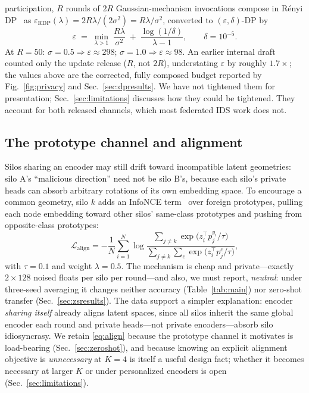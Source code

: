 \documentclass[journal]{IEEEtran}
\newcommand{\eps}{\varepsilon}
\begin{document}
participation, $R$ rounds of $2R$ Gaussian-mechanism invocations
compose in R\'enyi DP~\cite{renyidp} as $\eps_{\mathrm{RDP}}(\lambda) =
2R\lambda / (2\sigma^{2}) = R\lambda/\sigma^{2}$, converted to
$(\eps, \delta)$-DP by
\begin{equation}
\eps \;=\; \min_{\lambda > 1}\;
\frac{R\lambda}{\sigma^{2}} \;+\;
\frac{\log(1/\delta)}{\lambda - 1},
\qquad \delta = 10^{-5}.
\label{eq:rdp}
\end{equation}
At $R{=}50$: $\sigma{=}0.5 \Rightarrow \eps{\approx}298$;
$\sigma{=}1.0 \Rightarrow \eps{\approx}98$. An earlier internal draft
counted only the update release ($R$, not $2R$), understating $\eps$ by
roughly $1.7\times$; the values above are the corrected, fully
composed budget reported by Fig.~\ref{fig:privacy} and
Sec.~\ref{sec:dpresults}. We have not tightened them for presentation;
Sec.~\ref{sec:limitations} discusses how they could be tightened. They
account for both released channels, which most federated IDS work does
not.

\subsection{The prototype channel and alignment}
\label{sec:align}
Silos sharing an encoder may still drift toward incompatible latent
geometries: silo A's ``malicious direction'' need not be silo B's,
because each silo's private heads can absorb arbitrary rotations of
its own embedding space. To encourage a common geometry, silo $k$ adds
an InfoNCE term~\cite{infonce} over foreign prototypes, pulling each
node embedding toward other silos' same-class prototypes and pushing
from opposite-class prototypes:
\begin{equation}
\mathcal{L}_{\mathrm{align}} = -\frac{1}{N}\sum_{i=1}^{N}
\log \frac{\sum_{j \ne k}\exp\!\big(z_i^{\top} p_j^{y_i}/\tau\big)}
{\sum_{j \ne k}\sum_{c}\exp\!\big(z_i^{\top} p_j^{c}/\tau\big)},
\label{eq:align}
\end{equation}
with $\tau{=}0.1$ and weight $\lambda{=}0.5$. The mechanism is cheap
and private---exactly $2 \times 128$ noised floats per silo per
round---and also, we must report, \emph{neutral}: under three-seed
averaging it changes neither accuracy (Table~\ref{tab:main}) nor
zero-shot transfer (Sec.~\ref{sec:zsresults}). The data support a
simpler explanation: encoder \emph{sharing itself} already aligns
latent spaces, since all silos inherit the same global encoder each
round and private heads---not private encoders---absorb silo
idiosyncrasy. We retain \eqref{eq:align} because the prototype channel
it motivates is load-bearing (Sec.~\ref{sec:zeroshot}), and because
knowing an explicit alignment objective is \emph{unnecessary} at
$K{=}4$ is itself a useful design fact; whether it becomes necessary
at larger $K$ or under personalized encoders is open
(Sec.~\ref{sec:limitations}).
\end{document}
